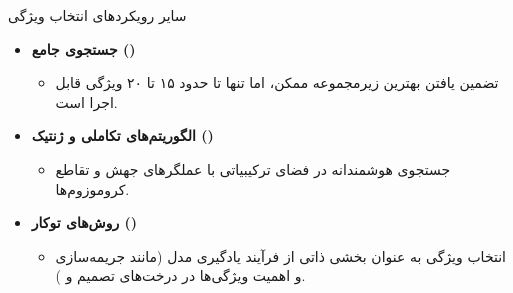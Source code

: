 \begin{frame}{سایر رویکردهای انتخاب ویژگی}
\begin{itemize}
  \item \textbf{جستجوی جامع ()}
  \begin{itemize}
    \item تضمین یافتن بهترین زیرمجموعه ممکن، اما تنها تا حدود ۱۵ تا ۲۰ ویژگی قابل اجرا است.
  \end{itemize}
  \vspace{0.2cm}
  \item \textbf{الگوریتم‌های تکاملی و ژنتیک ()}
  \begin{itemize}
    \item جستجوی هوشمندانه در فضای ترکیبیاتی با عملگرهای جهش و تقاطع کروموزوم‌ها.
  \end{itemize}
  \vspace{0.2cm}
  \item \textbf{روش‌های توکار ()}
  \begin{itemize}
    \item انتخاب ویژگی به عنوان بخشی ذاتی از فرآیند یادگیری مدل (مانند جریمه‌سازی  و اهمیت ویژگی‌ها در درخت‌های تصمیم و ).
  \end{itemize}
\end{itemize}
\end{frame}
